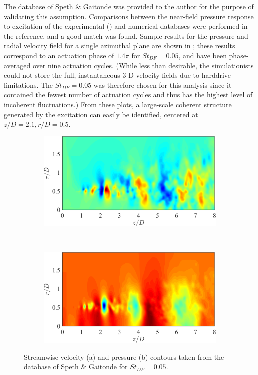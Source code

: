 The database of Speth \& Gaitonde \citep{Speth2014} was provided to the author for the purpose of validating this assumption.
Comparisons between the near-field pressure response to excitation of the experimental () and numerical databases were performed in the reference, and a good match was found.
Sample results for the pressure and radial velocity field for a single azimuthal plane are shown in ; these results correspond to an actuation phase of $1.4 \pi$ for $St_{DF} = 0.05$, and have been phase-averaged over nine actuation cycles.
(While less than desirable, the simulationists could not store the full, instantaneous 3-D velocity fields due to harddrive limitations. The $St_{DF} = 0.05$ was therefore chosen for this analysis since it contained the fewest number of actuation cycles and thus has the highest level of incoherent fluctuations.)
From these plots, a large-scale coherent structure generated by the excitation can easily be identified, centered at $z/D = 2.1, r/D = 0.5$.
\begin{figure}
	\centering
	\begin{subfigure}{0.75\textwidth}
		\centering
		\includegraphics[width=0.95\linewidth]{Figures/LES_phavg_streamwise_Ur.png}
		\caption{}
	\end{subfigure}\\
	\begin{subfigure}{0.75\textwidth}
		\centering
		\includegraphics[width=0.95\linewidth]{Figures/LES_phavg_streamwise_p.png}
		\caption{}
	\end{subfigure}
	\caption{Streamwise velocity (a) and pressure (b) contours taken from the database of Speth \& Gaitonde \citep{Speth2014} for $St_{DF} = 0.05$.}
	\label{fig:LES_streamwise_phavg}
\end{figure}


